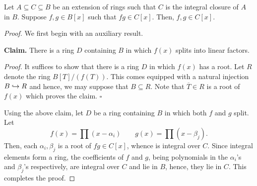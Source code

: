 \hrulefill 

\begin{lemma}
    Let $A\subseteq C\subseteq B$ be an extension of rings such that $C$ is the integral closure of $A$ in $B$. Suppose $f,g\in B[x]$ such that $fg\in C[x]$. Then, $f,g\in C[x]$.
\end{lemma}
\begin{proof}
    We first begin with an auxiliary result. 

    \noindent\textbf{Claim.} There is a ring $D$ containing $B$ in which $f(x)$ splits into linear factors. 

    \noindent\textit{Proof.} It suffices to show that there is a ring $D$ in which $f(x)$ has a root. Let $R$ denote the ring $B[T]/(f(T))$. This comes equipped with a natural injection $B\hookrightarrow R$ and hence, we may suppose that $B\subseteq R$. Note that $\overline T\in R$ is a root of $f(x)$ which proves the claim. $\square$

    Using the above claim, let $D$ be a ring containing $B$ in which both $f$ and $g$ split. Let 
    \begin{equation*}
        f(x) = \prod(x - \alpha_i) \qquad g(x) = \prod(x - \beta_j).
    \end{equation*}
    Then, each $\alpha_i,\beta_j$ is a root of $fg\in C[x]$, whence is integral over $C$. Since integral elements form a ring, the coefficients of $f$ and $g$, being polynomials in the $\alpha_i$'s and $\beta_j$'s respectively, are integral over $C$ and lie in $B$, hence, they lie in $C$. This completes the proof.
\end{proof}

